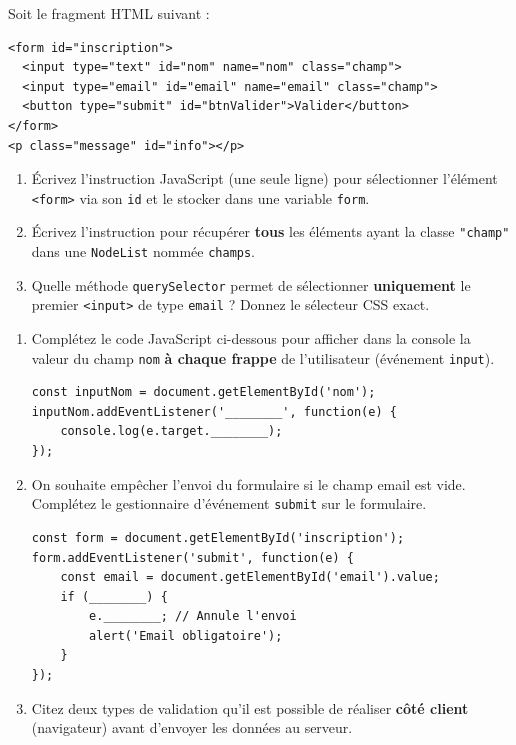 \documentclass[11pt]{article}
\begin{document}
\begin{exercice}
Soit le fragment HTML suivant :
\begin{verbatim}
<form id="inscription">
  <input type="text" id="nom" name="nom" class="champ">
  <input type="email" id="email" name="email" class="champ">
  <button type="submit" id="btnValider">Valider</button>
</form>
<p class="message" id="info"></p>
\end{verbatim}
\begin{enumerate}
    \item Écrivez l'instruction JavaScript (une seule ligne) pour sélectionner l'élément \texttt{<form>} via son \texttt{id} et le stocker dans une variable \texttt{form}.
    \item Écrivez l'instruction pour récupérer \textbf{tous} les éléments ayant la classe \texttt{"champ"} dans une \texttt{NodeList} nommée \texttt{champs}.
    \item Quelle méthode \texttt{querySelector} permet de sélectionner \textbf{uniquement} le premier \texttt{<input>} de type \texttt{email} ? Donnez le sélecteur CSS exact.
\end{enumerate}
\end{exercice}

\begin{exercice}
\begin{enumerate}
    \item Complétez le code JavaScript ci-dessous pour afficher dans la console la valeur du champ \texttt{nom} \textbf{à chaque frappe} de l'utilisateur (événement \texttt{input}).
\begin{verbatim}
const inputNom = document.getElementById('nom');
inputNom.addEventListener('________', function(e) {
    console.log(e.target.________);
});
\end{verbatim}
    \item On souhaite empêcher l'envoi du formulaire si le champ email est vide. Complétez le gestionnaire d'événement \texttt{submit} sur le formulaire.
\begin{verbatim}
const form = document.getElementById('inscription');
form.addEventListener('submit', function(e) {
    const email = document.getElementById('email').value;
    if (________) {
        e.________; // Annule l'envoi
        alert('Email obligatoire');
    }
});
\end{verbatim}
    \item Citez deux types de validation qu'il est possible de réaliser \textbf{côté client} (navigateur) avant d'envoyer les données au serveur.
\end{enumerate}
\end{exercice}
\end{document}
